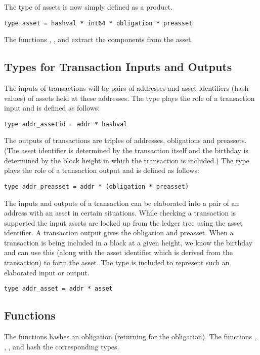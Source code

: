 The type {} of assets is now simply defined as a product.
\begin{verbatim}
type asset = hashval * int64 * obligation * preasset
\end{verbatim}
The functions {}, {},
{} and {}
extract the components from the asset.

\subsection{Types for Transaction Inputs and Outputs}

The inputs of transactions will be pairs of addresses and asset identifiers (hash values)
of assets held at these addresses. The type {}
plays the role of a transaction input and is defined as follows:
\begin{verbatim}
type addr_assetid = addr * hashval
\end{verbatim}
The outputs of transactions are triples of addresses, obligations and preassets.
(The asset identifier is determined by the transaction itself and the birthday
is determined by the block height in which the transaction is included.)
The type {} plays the role of a transaction output and is defined as follows:
\begin{verbatim}
type addr_preasset = addr * (obligation * preasset)
\end{verbatim}
The inputs and outputs of a transaction can be elaborated into a pair of an address with an asset
in certain situations.
While checking a transaction is supported the input assets are looked up from the ledger tree
using the asset identifier. 
A transaction output gives the obligation and preasset.
When a transaction is being included in a block at a given height,
we know the birthday and can use this (along with the asset identifier which 
is derived from the transaction) to form the asset.
The type {} is included to represent such an elaborated input or output.
\begin{verbatim}
type addr_asset = addr * asset
\end{verbatim}

\subsection{Functions}

The functions {} hashes an obligation (returning {}
for the {} obligation).
The functions {},
{},
{},
{} and
{}
hash the corresponding types.

